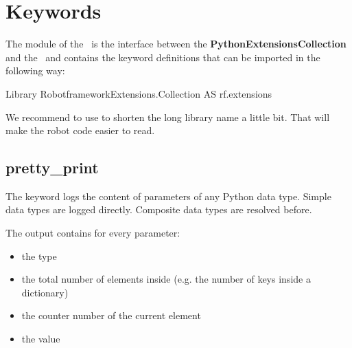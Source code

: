 %



%

\section{Keywords}

The  module of the \pkg\ is the interface between the \textbf{PythonExtensionsCollection} and the
\rfw\ and contains the keyword definitions that can be imported in the following way:

\begin{robotcode}
Library    RobotframeworkExtensions.Collection    AS    rf.extensions
\end{robotcode}

We recommend to use  to shorten the long library name a little bit. That will make the robot code
easier to read.

\subsection{pretty\_print}

The  keyword logs the content of parameters of any Python data type. Simple data types are logged directly.
Composite data types are resolved before.

\vspace{1ex}

The output contains for every parameter:

\begin{itemize}
   \item the type
   \item the total number of elements inside (e.g. the number of keys inside a dictionary)
   \item the counter number of the current element
   \item the value
\end{itemize}

